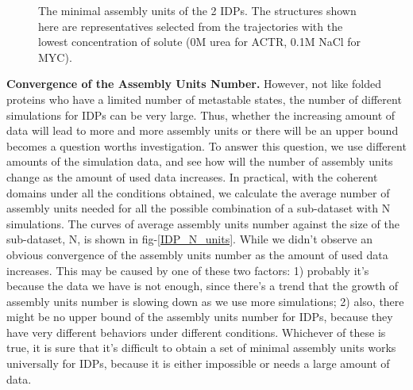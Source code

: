 \documentclass[journal=jacsat,manuscript=article]{achemso}
\begin{document}
\begin{figure}[htbp]
  \centering
  \caption{\label{IDP_all_beads}The minimal assembly units of the 2 IDPs. The structures shown here are representatives selected from the trajectories with the lowest concentration of solute (0M urea for ACTR, 0.1M NaCl for MYC).}
\end{figure}

{\bf Convergence of the Assembly Units Number.} However, not like folded proteins who have a limited number of metastable states, the number of different simulations for IDPs can be very large. Thus, whether the increasing amount of data will lead to more and more assembly units or there will be an upper bound becomes a question worths investigation. To answer this question, we use different amounts of the simulation data, and see how will the number of assembly units change as the amount of used data increases. In practical, with the coherent domains under all the conditions obtained, we calculate the average number of assembly units needed for all the possible combination of a sub-dataset with N simulations. The curves of average assembly units number against the size of the sub-dataset, N, is shown in fig-\ref{IDP_N_units}. While we didn't observe an obvious convergence of the assembly units number as the amount of used data increases. This may be caused by one of these two factors: 1) probably it's because the data we have is not enough, since there's a trend that the growth of assembly units number is slowing down as we use more simulations; 2) also, there might be no upper bound of the assembly units number for IDPs, because they have very different behaviors under different conditions. Whichever of these is true, it is sure that it's difficult to obtain a set of minimal assembly units works universally for IDPs, because it is either impossible or needs a large amount of data. 
\end{document}
